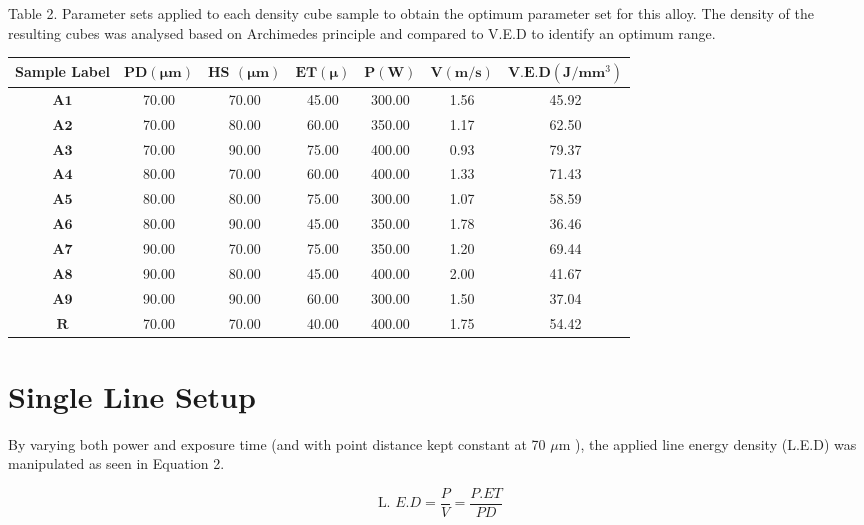 \documentclass[10pt]{article}
\begin{document}
Table 2. Parameter sets applied to each density cube sample to obtain the optimum parameter set for this alloy. The density of the resulting cubes was analysed based on Archimedes principle and compared to V.E.D to identify an optimum range.

\begin{center}
\begin{tabular}{ccccccc}
\hline
Sample Label & $\mathbf{P D}(\boldsymbol{\mu m})$ & HS $(\boldsymbol{\mu m})$ & $\mathbf{E T}(\boldsymbol{\mu})$ & $\mathbf{P}(\mathbf{W})$ & $\mathbf{V}(\mathbf{m} / \mathbf{s})$ & $\mathbf{V . E . D}\left(\mathbf{J} / \mathbf{m m}^{3}\right)$ \\
\hline
$\mathbf{A 1}$ & 70.00 & 70.00 & 45.00 & 300.00 & 1.56 & 45.92 \\
\hline
$\mathbf{A 2}$ & 70.00 & 80.00 & 60.00 & 350.00 & 1.17 & 62.50 \\
\hline
$\mathbf{A 3}$ & 70.00 & 90.00 & 75.00 & 400.00 & 0.93 & 79.37 \\
\hline
$\mathbf{A 4}$ & 80.00 & 70.00 & 60.00 & 400.00 & 1.33 & 71.43 \\
\hline
$\mathbf{A 5}$ & 80.00 & 80.00 & 75.00 & 300.00 & 1.07 & 58.59 \\
\hline
$\mathbf{A 6}$ & 80.00 & 90.00 & 45.00 & 350.00 & 1.78 & 36.46 \\
\hline
$\mathbf{A 7}$ & 90.00 & 70.00 & 75.00 & 350.00 & 1.20 & 69.44 \\
\hline
$\mathbf{A 8}$ & 90.00 & 80.00 & 45.00 & 400.00 & 2.00 & 41.67 \\
\hline
$\mathbf{A 9}$ & 90.00 & 90.00 & 60.00 & 300.00 & 1.50 & 37.04 \\
\hline
$\mathbf{R}$ & 70.00 & 70.00 & 40.00 & 400.00 & 1.75 & 54.42 \\
\hline
\end{tabular}
\end{center}

\section*{Single Line Setup}
By varying both power and exposure time (and with point distance kept constant at 70 $\mu \mathrm{m}$ ), the applied line energy density (L.E.D) was manipulated as seen in Equation 2.


\begin{equation*}
\text { L. } E . D=\frac{P}{V}=\frac{P . E T}{P D} \tag{2}
\end{equation*}
\end{document}
